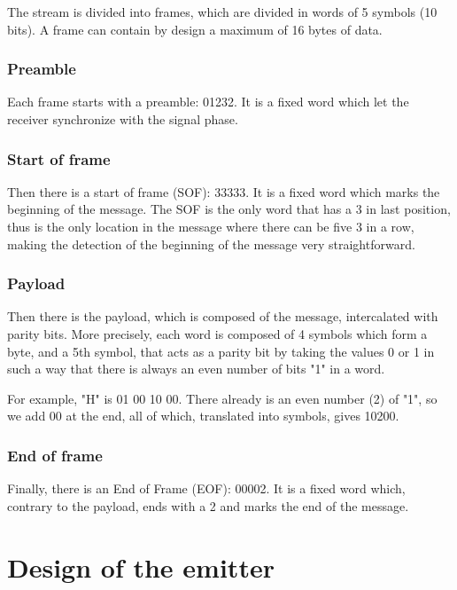 \documentclass[12pt]{report}
\begin{document}
The stream is divided into frames, which are divided in words of 5 symbols (10 bits). A frame can contain by design a maximum of 16 bytes of data.

\subsubsection{Preamble}

Each frame starts with a preamble: 01232. It is a fixed word which let the receiver synchronize with the signal phase.

\subsubsection{Start of frame}

Then there is a start of frame (SOF): 33333. It is a fixed word which marks the beginning of the message. The SOF is the only word that has a 3 in last position, thus is the only location in the message where there can be five 3 in a row, making the detection of the beginning of the message very straightforward.

\subsubsection{Payload}

Then there is the payload, which is composed of the message, intercalated with parity bits. More precisely, each word is composed of 4 symbols which form a byte, and a 5th symbol, that acts as a parity bit by taking the values 0 or 1 in such a way that there is always an even number of bits "1" in a word.

For example, "H" is 01 00 10 00. There already is an even number (2) of "1", so we add 00 at the end, all of which, translated into symbols, gives 10200.

\subsubsection{End of frame}

Finally, there is an End of Frame (EOF): 00002. It is a fixed word which, contrary to the payload, ends with a 2 and marks the end of the message.



\section{Design of the emitter}
\end{document}
